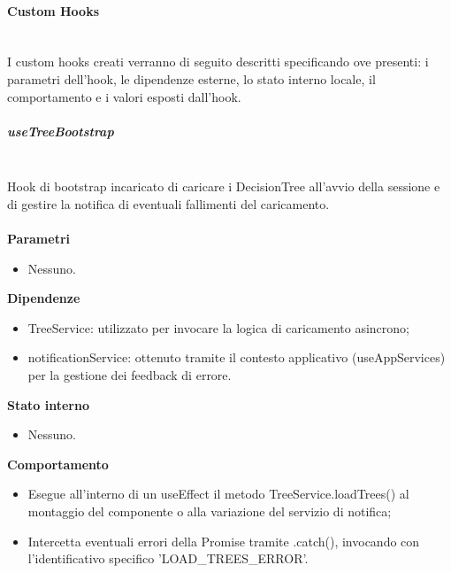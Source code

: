 \documentclass[a4paper,12pt]{article}
\begin{document}
            \paragraph{Custom Hooks}\mbox{}\\
                I custom hooks creati verranno di seguito descritti specificando ove presenti: i parametri dell'hook, le dipendenze esterne, lo stato interno locale, il comportamento e i valori esposti dall'hook.\\
                \subparagraph{useTreeBootstrap}\mbox{}\\
                Hook di bootstrap incaricato di caricare i {\ttfamily DecisionTree} all'avvio della sessione e di gestire la notifica di eventuali fallimenti del caricamento.\\\\
                \textbf{Parametri}
                \begin{itemize}
                    \item Nessuno.
                \end{itemize}
                \textbf{Dipendenze}
                \begin{itemize}
                    \item {\ttfamily TreeService}: utilizzato per invocare la logica di caricamento asincrono;
                    \item {\ttfamily notificationService}: ottenuto tramite il contesto applicativo ({\ttfamily useAppServices}) per la gestione dei feedback di errore.
                \end{itemize}
                \textbf{Stato interno}
                \begin{itemize}
                    \item Nessuno.
                \end{itemize}
                \textbf{Comportamento}
                \begin{itemize}
                    \item Esegue all'interno di un {\ttfamily useEffect} il metodo {\ttfamily TreeService.loadTrees()} al montaggio del componente o alla variazione del servizio di notifica;
                    \item Intercetta eventuali errori della {\ttfamily Promise} tramite {\ttfamily .catch()}, invocando  con l'identificativo specifico {\ttfamily 'LOAD\_TREES\_ERROR'}.
                \end{itemize}
                
\end{document}
